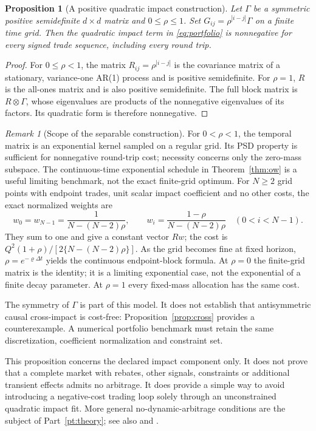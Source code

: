 \documentclass[11pt]{article}
\numberwithin{equation}{section}
\newtheorem{proposition}[theorem]{Proposition}
\theoremstyle{definition}
\theoremstyle{remark}
\newtheorem{remark}[theorem]{Remark}
\theoremstyle{definition}
\begin{document}
\begin{proposition}[A positive quadratic impact construction]\label{prop:kron}
Let $\Gamma$ be a symmetric positive semidefinite $d\times d$ matrix and
$0\leq\rho\leq1$. Set $G_{ij}=\rho^{|i-j|}\Gamma$ on a finite time grid.
Then the quadratic impact term in \eqref{eq:portfolio} is nonnegative for
every signed trade sequence, including every round trip.
\end{proposition}
\begin{proof}
For $0\leq\rho<1$, the matrix $R_{ij}=\rho^{|i-j|}$ is the covariance matrix
of a stationary, variance-one AR(1) process and is positive semidefinite.
For $\rho=1$, $R$ is the all-ones matrix and is also positive semidefinite.
The full block matrix is $R\otimes\Gamma$, whose eigenvalues are products
of the nonnegative eigenvalues of its factors. Its quadratic form is
therefore nonnegative.
\end{proof}

\begin{remark}[Scope of the separable construction]
For $0<\rho<1$, the temporal matrix is an exponential kernel sampled on a
regular grid. Its PSD property is sufficient for nonnegative round-trip cost;
necessity concerns only the zero-mass subspace. The continuous-time exponential
schedule in Theorem~\ref{thm:ow} is a useful limiting benchmark, not the exact
finite-grid optimum. For $N\geq2$ grid points with endpoint trades, unit scalar
impact coefficient and no other costs, the exact normalized weights are
\[
 w_0=w_{N-1}=\frac1{N-(N-2)\rho},\qquad
 w_i=\frac{1-\rho}{N-(N-2)\rho}\quad(0<i<N-1).
\]
They sum to one and give a constant vector $Rw$; the cost is
$Q^2(1+\rho)/[2\{N-(N-2)\rho\}]$. As the grid becomes fine at fixed horizon,
$\rho=e^{-\varrho\Delta t}$ yields the continuous endpoint-block formula.
At $\rho=0$ the finite-grid matrix is the identity; it is a limiting exponential
case, not the exponential of a finite decay parameter. At $\rho=1$ every
fixed-mass allocation has the same cost.

The symmetry of $\Gamma$ is part of this model. It does not establish that
antisymmetric causal cross-impact is cost-free: Proposition~\ref{prop:cross}
provides a counterexample. A numerical portfolio benchmark must retain the same
discretization, coefficient normalization and constraint set.
\end{remark}

This proposition concerns the declared impact component only. It does not
prove that a complete market with rebates, other signals, constraints or
additional transient effects admits no arbitrage. It does provide a simple
way to avoid introducing a negative-cost trading loop solely through an
unconstrained quadratic impact fit. More general no-dynamic-arbitrage
conditions are the subject of Part~\ref{pt:theory}; see also
\citet{gatheral2010} and \citet{schneider2019}.
\end{document}
